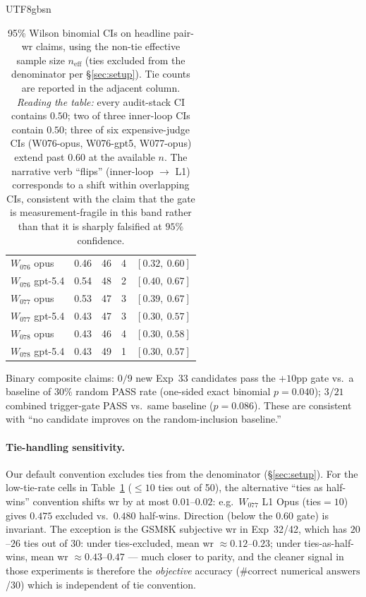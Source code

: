 \documentclass{article}
\begin{document}
\begin{CJK*}{UTF8}{gbsn}
\begin{table}[h]
\begin{tabular}{l c c c c}
    \quad \(W_{076}\) opus & 0.46 & 46 & 4 & \([0.32,\ 0.60]\) \\
    \quad \(W_{076}\) gpt-5.4 & 0.54 & 48 & 2 & \([0.40,\ 0.67]\) \\
    \quad \(W_{077}\) opus & 0.53 & 47 & 3 & \([0.39,\ 0.67]\) \\
    \quad \(W_{077}\) gpt-5.4 & 0.43 & 47 & 3 & \([0.30,\ 0.57]\) \\
    \quad \(W_{078}\) opus & 0.43 & 46 & 4 & \([0.30,\ 0.58]\) \\
    \quad \(W_{078}\) gpt-5.4 & 0.43 & 49 & 1 & \([0.30,\ 0.57]\) \\
    \bottomrule
  \end{tabular}
  \caption{95\% Wilson binomial CIs on headline pair-wr claims,
    using the non-tie effective sample size \(n_{\mathrm{eff}}\)
    (ties excluded from the denominator per
    \S\ref{sec:setup}). Tie counts are reported in the adjacent
    column. \emph{Reading the table:} every audit-stack CI
    contains \(0.50\); two of three inner-loop CIs contain
    \(0.50\); three of six expensive-judge CIs (W076-opus,
    W076-gpt5, W077-opus) extend past \(0.60\) at the available
    \(n\). The narrative verb ``flips'' (inner-loop \(\to\) L1)
    corresponds to a shift within overlapping CIs, consistent
    with the claim that the gate is measurement-fragile in this
    band rather than that it is sharply falsified at \(95\%\)
    confidence.}
  \label{tab:ci}
\end{table}

Binary composite claims: \(0/9\) new Exp~33 candidates pass the
\(+10\)pp gate vs.\ a baseline of \(30\%\) random PASS rate
(one-sided exact binomial \(p = 0.040\)); \(3/21\) combined
trigger-gate PASS vs.\ same baseline (\(p = 0.086\)). These are
consistent with ``no candidate improves on the random-inclusion
baseline.''

\paragraph{Tie-handling sensitivity.} Our default convention
excludes ties from the denominator (\S\ref{sec:setup}). For the
low-tie-rate cells in Table~\ref{tab:ci} (\(\leq 10\) ties out
of 50), the alternative ``ties as half-wins'' convention shifts
wr by at most \(0.01\)--\(0.02\): e.g.\ \(W_{077}\) L1 Opus
(ties\(=10\)) gives \(0.475\) excluded vs.\ \(0.480\) half-wins.
Direction (below the \(0.60\) gate) is invariant. The exception
is the GSM8K subjective wr in Exp~32/42, which has \(20\)--\(26\)
ties out of 30: under ties-excluded, mean wr \(\approx 0.12\)--\(0.23\);
under ties-as-half-wins, mean wr \(\approx 0.43\)--\(0.47\) ---
much closer to parity, and the cleaner signal in those experiments
is therefore the \emph{objective} accuracy
(\(\#\text{correct numerical answers}\)/30) which is independent
of tie convention.


\end{CJK*}
\end{document}
